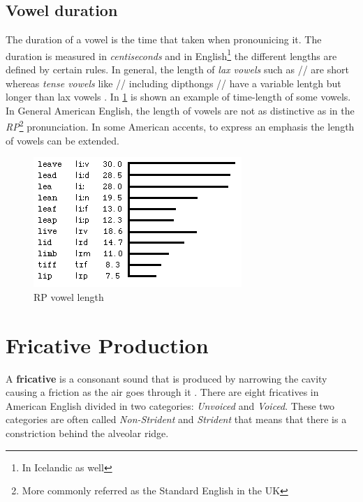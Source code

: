 \subsection{Vowel duration}
\label{sub:vowel_duration}
The duration of a vowel is the time that taken when pronounicing it. The duration is measured in \textit{centiseconds} and in English\footnote{In Icelandic as well} the different lengths are defined by certain rules. In general, the length of \textit{lax vowels} such as // are short whereas \textit{tense vowels} like // including dipthongs // have a variable lentgh but longer than lax vowels \cite{vowel_length}. In \ref{fig:vowel_length} is shown an example of time-length of some vowels.
\noindent In General American English, the length of vowels are not as distinctive as in the \textit{RP}\footnote{More commonly referred as the Standard English in the UK} pronunciation. In some American accents, to express an emphasis the length of vowels can be extended.

\begin{figure}[!ht]
    \centering
    \includegraphics[scale=0.6]{Figures/vowel_length.png}
    \caption{RP vowel length \cite{vowel_length}}
    \label{fig:vowel_length}
\end{figure}


\section{Fricative Production}
\label{sec:fricative_production}
A \textbf{fricative} is a consonant sound that is produced by narrowing the cavity causing a friction as the air goes through it \cite{fricatives}. There are eight fricatives in American English divided in two categories: \textit{Unvoiced} and \textit{Voiced}. These two categories are often called \textit{Non-Strident} and \textit{Strident} that means that there is a constriction behind the alveolar ridge.


